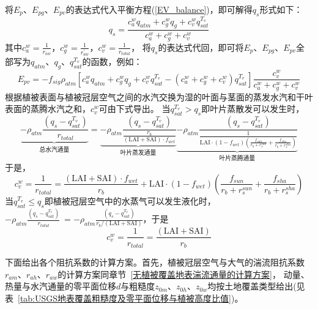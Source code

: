 将$E_p$、$E_{pg}$、$E_{pv}$的表达式代入平衡方程(\ref{EV_balance})，即可解得$q_s$形式如下：
\begin{equation}
q_{s}=\frac{c_{a}^{w} q_{atm}+c_{g}^{w} q_{g}+c_{v}^{w} q_{s a t}^{T_{v}}}{c_{a}^{w}+c_{g}^{w}+c_{v}^{w}}
\end{equation}
其中$c_a^w=\frac{1}{r_{aw}}$，$c_g^w=\frac{1}{r_{aw}^\prime}$，$c_v^w=\frac{1}{r_{total}}$，
将$q_s$的表达式代回，即可将$E_p$、$E_{pg}$、$E_{pv}$全部写为$q_{atm}$、$q_g$、$q_{sat}^{T_v}$的函数，例如：
\begin{equation}
E_{p v}=-f_{sig} \rho_{atm}\left[c_{a}^{w} q_{atm}+c_{g}^{w} q_{g}+c_{v}^{w} q_{s a t}^{T_{v}}-
\left(c_{a}^{w}+c_{g}^{w}+c_{v}^{w}\right) q_{s a t}^{T_{v}}\right] \frac{c_{v}^{w}}{c_{a}^{w}+c_{g}^{w}+c_{v}^{w}}
\end{equation}
根据植被表面与植被冠层空气之间的水汽交换为湿的叶面与茎面的蒸发水汽和干叶表面的蒸腾水汽之和，$c_v^w$可由下式导出。
当$q_{sat}^{T_v}>q_s$即叶片蒸散发可以发生时，%
\begin{equation}
\underbrace{-\rho_{atm} \frac{\left(q_{s}-q_{s a t}^{T_{v}}\right)}{r_{{total }}}}_{\text{总水汽通量}}
=\underbrace{-\rho_{atm} 
\frac{\left(q_{s}-q_{s a t}^{T_{v}}\right)}{\frac{r_{b}}{(\text {LAI}+\text {SAI}) \cdot f_{{wet }}}}}_{\text{叶片蒸发通量}}
\underbrace{-\rho_{atm} \frac{\left(q_{s}-q_{s a t}^{T_{v}}\right)}{\frac{1}{\text {LAI} \cdot \left(1-f_{wet}\right)\left(\frac{f_{sun}}{r_{b}+r_{s}^{sun}} + \frac{f_{sha}}{r_{b}+r_{s}^{sha}}\right)}}}_{\text{叶片蒸腾通量}}
\end{equation}
于是，
\begin{equation}
c_{v}^{w}=\frac{1}{r_{{total }}}=\frac{(\text {LAI}+\text {SAI}) \cdot f_{{wet }}}{r_{b}}+\text {LAI} \cdot \left(1-f_{wet}\right)\left(\frac{f_{sun}}{r_{b}+r_{s}^{sun}} + \frac{f_{sha}}{r_{b}+r_{s}^{sha}}\right)
\end{equation}
当$q_{sat}^{T_v}\le q_s$即植被冠层空气中的水蒸气可以发生液化时，
$-\rho_{atm}\frac{\left(q_s-q_{sat}^{T_v}\right)}{r_{total}}\ =-\rho_{atm} \frac{\left(q_s-q_{sat}^{T_v}\right)}{r_b/\left(\text {LAI}+\text {SAI}\right)}$，于是
\begin{equation}
c_{v}^{w}=\frac{1}{r_{{total }}}=\frac{(\text {LAI}+\text {SAI})}{r_{b}}
\end{equation}

下面给出各个阻抗系数的计算方案。首先，植被冠层空气与大气的湍流阻抗系数$r_{am}$、$r_{ah}$、$r_{aw}$的计算方案同章节~\ref{无植被覆盖地表湍流通量的计算方案}，
动量、热量与水汽通量的零平面位移$d$与粗糙度$z_{0m}$、$z_{0h}$、$z_{0w}$均按土地覆盖类型给出(见
表~\ref{tab:USGS地表覆盖粗糙度及零平面位移与植被高度比值})。

